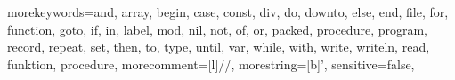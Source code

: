 \usepackage{listings}
\usepackage{color}







{
	morekeywords={and, array, begin, case, const, div, do, downto, else, end, file, for, function, goto, if, in, label, mod, nil, not, of, or, packed, procedure, program, record, repeat, set, then, to, type, until, var, while, with, write, writeln, read, funktion, procedure},
	morecomment=[l]{//},
	morestring=[b]',
	sensitive=false,
}


